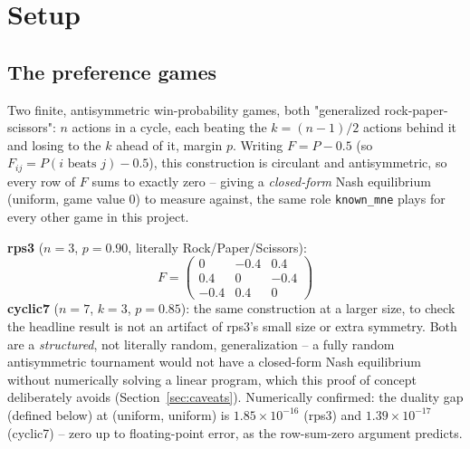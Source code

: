 \documentclass[11pt]{article}
\begin{document}
\section{Setup}

\subsection{The preference games}
Two finite, antisymmetric win-probability games, both "generalized
rock-paper-scissors": $n$ actions in a cycle, each beating the $k=(n-1)/2$
actions behind it and losing to the $k$ ahead of it, margin $p$. Writing
$F = P - 0.5$ (so $F_{ij} = P(i \text{ beats } j) - 0.5$), this construction
is circulant and antisymmetric, so every row of $F$ sums to exactly zero --
giving a \emph{closed-form} Nash equilibrium (uniform, game value 0) to
measure against, the same role \texttt{known\_mne} plays for every other
game in this project.

\textbf{rps3} ($n=3$, $p=0.90$, literally Rock/Paper/Scissors):
\[
F = \begin{pmatrix} 0 & -0.4 & 0.4 \\ 0.4 & 0 & -0.4 \\ -0.4 & 0.4 & 0 \end{pmatrix}
\]
\textbf{cyclic7} ($n=7$, $k=3$, $p=0.85$): the same construction at a larger
size, to check the headline result is not an artifact of rps3's small size
or extra symmetry. Both are a \emph{structured}, not literally random,
generalization -- a fully random antisymmetric tournament would not have a
closed-form Nash equilibrium without numerically solving a linear program,
which this proof of concept deliberately avoids (Section~\ref{sec:caveats}).
Numerically confirmed: the duality gap (defined below) at (uniform, uniform)
is $1.85\times10^{-16}$ (rps3) and $1.39\times10^{-17}$ (cyclic7) -- zero up
to floating-point error, as the row-sum-zero argument predicts.
\end{document}
